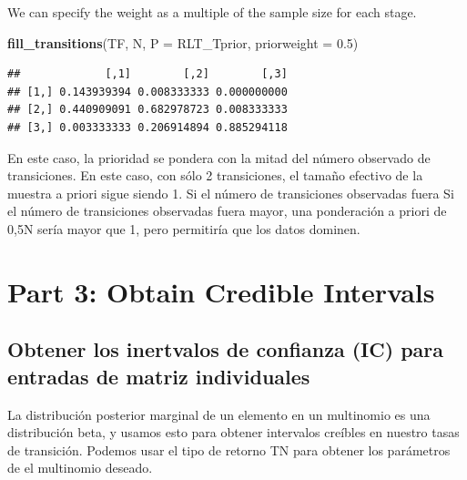 \documentclass[
]{book}
\newenvironment{Shaded}{\begin{snugshade}}{\end{snugshade}}
\newcommand{\AttributeTok}[1]{\textcolor[rgb]{0.13,0.29,0.53}{#1}}
\newcommand{\FloatTok}[1]{\textcolor[rgb]{0.00,0.00,0.81}{#1}}
\newcommand{\FunctionTok}[1]{\textcolor[rgb]{0.13,0.29,0.53}{\textbf{#1}}}
\newcommand{\NormalTok}[1]{#1}
\theoremstyle{definition}
\theoremstyle{definition}
\theoremstyle{definition}
\theoremstyle{definition}
\theoremstyle{remark}
\begin{document}
We can specify the weight as a multiple of the sample size for each
stage.

\begin{Shaded}
\begin{Highlighting}[]
\FunctionTok{fill\_transitions}\NormalTok{(TF, N, }\AttributeTok{P =}\NormalTok{ RLT\_Tprior, }\AttributeTok{priorweight =} \FloatTok{0.5}\NormalTok{)}
\end{Highlighting}
\end{Shaded}

\begin{verbatim}
##             [,1]        [,2]        [,3]
## [1,] 0.143939394 0.008333333 0.000000000
## [2,] 0.440909091 0.682978723 0.008333333
## [3,] 0.003333333 0.206914894 0.885294118
\end{verbatim}

En este caso, la prioridad se pondera con la mitad del número observado
de transiciones. En este caso, con sólo 2 transiciones, el tamaño
efectivo de la muestra a priori sigue siendo 1. Si el número de
transiciones observadas fuera Si el número de transiciones observadas
fuera mayor, una ponderación a priori de 0,5N sería mayor que 1, pero
permitiría que los datos dominen.

\hypertarget{part-3-obtain-credible-intervals}{%
\section{Part 3: Obtain Credible Intervals}\label{part-3-obtain-credible-intervals}}

\hypertarget{obtener-los-inertvalos-de-confianza-ic-para-entradas-de-matriz-individuales}{%
\subsection{Obtener los inertvalos de confianza (IC) para entradas de matriz individuales}\label{obtener-los-inertvalos-de-confianza-ic-para-entradas-de-matriz-individuales}}

La distribución posterior marginal de un elemento en un multinomio es una
distribución beta, y usamos esto para obtener intervalos creíbles en nuestro
tasas de transición. Podemos usar el tipo de retorno TN para obtener los parámetros de
el multinomio deseado.
\end{document}
